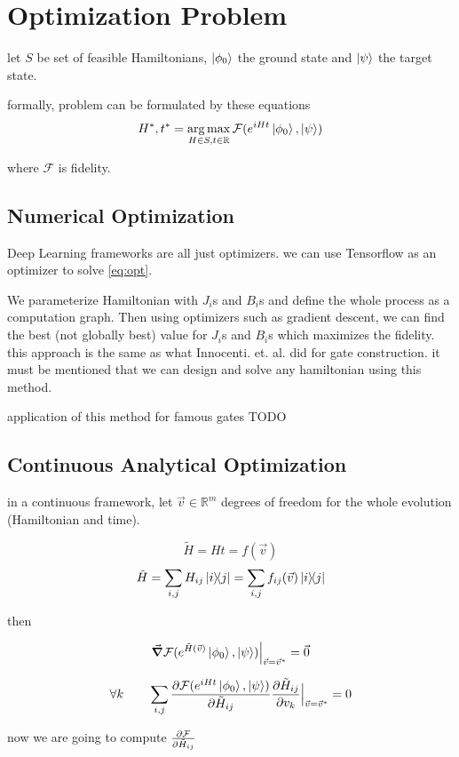 \documentclass{article}
\DeclareMathOperator*{\argmax}{arg\,max}
\begin{document}
\section{Optimization Problem}
let $S$ be set of feasible Hamiltonians, $\ket{\phi_0}$ the ground state and $\ket{\psi}$ the target state.

formally, problem can be formulated by these equations
\begin{equation} 
\label{eq:opt}
H^*, t^* = \argmax_{H \in S, t \in \mathbb{R}} \mathcal{F}(e^{iHt} \ket{\phi_0}, \ket{\psi})
\end{equation}

where $\mathcal{F}$ is fidelity.

\subsection{Numerical Optimization}
Deep Learning frameworks are all just optimizers. we can use Tensorflow as an optimizer to solve \ref{eq:opt}.

We parameterize Hamiltonian with $J_i$s and $B_i$s and define the whole process as a computation graph. Then using optimizers such as gradient descent, we can find the best (not globally best) value for $J_i$s and $B_i$s which maximizes the fidelity. this approach is the same as what Innocenti. et. al. did for gate construction. it must be mentioned that we can design and solve any hamiltonian using this method.

application of this method for famous gates
 TODO

\subsection{Continuous Analytical Optimization}
in a continuous framework, let $\vec{v} \in \mathbb{R}^m$ degrees of freedom for the whole evolution (Hamiltonian and time).

\[ \tilde{H} = Ht = f(\vec{v}) \]
\[ \tilde{H} = \sum_{i, j} H_{ij} \dyad{i}{j} = \sum_{i, j} f_{ij}(\vec{v}) \dyad{i}{j} \]

then

\[\gradient \mathcal{F}(e^{\tilde{H}(\vec{v})} \ket{\phi_0}, \ket{\psi}) \Big|_{\vec{v} = \vec{v}^*} = \vec{0} \]

\[ \forall k \quad\quad \sum_{i,j} \pdv{\mathcal{F}(e^{iHt} \ket{\phi_0}, \ket{\psi})}{\tilde{H}_{ij}} \pdv{\tilde{H}_{ij}}{v_k}  \Big|_{\vec{v} = \vec{v}^*} = 0 \]

now we are going to compute $\pdv{\mathcal{F}}{\tilde{H}_{ij}}$
\end{document}
